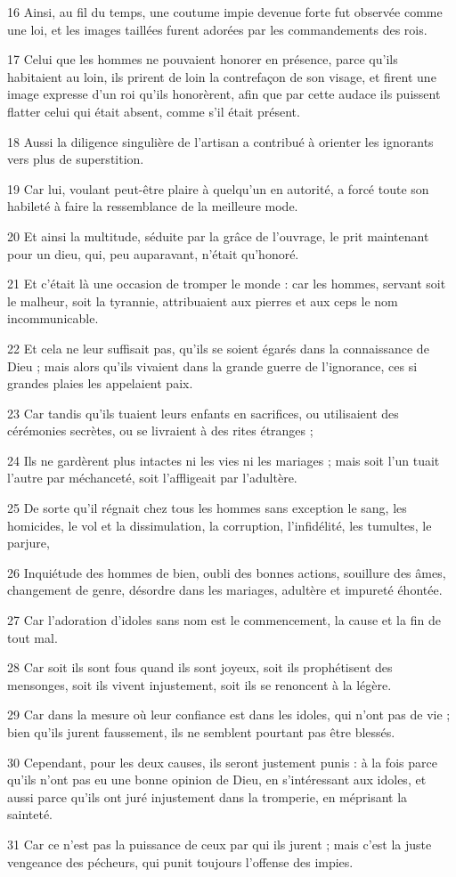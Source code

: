\par 16 Ainsi, au fil du temps, une coutume impie devenue forte fut observée comme une loi, et les images taillées furent adorées par les commandements des rois.
\par 17 Celui que les hommes ne pouvaient honorer en présence, parce qu'ils habitaient au loin, ils prirent de loin la contrefaçon de son visage, et firent une image expresse d'un roi qu'ils honorèrent, afin que par cette audace ils puissent flatter celui qui était absent, comme s'il était présent.
\par 18 Aussi la diligence singulière de l'artisan a contribué à orienter les ignorants vers plus de superstition.
\par 19 Car lui, voulant peut-être plaire à quelqu'un en autorité, a forcé toute son habileté à faire la ressemblance de la meilleure mode.
\par 20 Et ainsi la multitude, séduite par la grâce de l'ouvrage, le prit maintenant pour un dieu, qui, peu auparavant, n'était qu'honoré.
\par 21 Et c'était là une occasion de tromper le monde : car les hommes, servant soit le malheur, soit la tyrannie, attribuaient aux pierres et aux ceps le nom incommunicable.
\par 22 Et cela ne leur suffisait pas, qu'ils se soient égarés dans la connaissance de Dieu ; mais alors qu'ils vivaient dans la grande guerre de l'ignorance, ces si grandes plaies les appelaient paix.
\par 23 Car tandis qu'ils tuaient leurs enfants en sacrifices, ou utilisaient des cérémonies secrètes, ou se livraient à des rites étranges ;
\par 24 Ils ne gardèrent plus intactes ni les vies ni les mariages ; mais soit l'un tuait l'autre par méchanceté, soit l'affligeait par l'adultère.
\par 25 De sorte qu'il régnait chez tous les hommes sans exception le sang, les homicides, le vol et la dissimulation, la corruption, l'infidélité, les tumultes, le parjure,
\par 26 Inquiétude des hommes de bien, oubli des bonnes actions, souillure des âmes, changement de genre, désordre dans les mariages, adultère et impureté éhontée.
\par 27 Car l'adoration d'idoles sans nom est le commencement, la cause et la fin de tout mal.
\par 28 Car soit ils sont fous quand ils sont joyeux, soit ils prophétisent des mensonges, soit ils vivent injustement, soit ils se renoncent à la légère.
\par 29 Car dans la mesure où leur confiance est dans les idoles, qui n'ont pas de vie ; bien qu'ils jurent faussement, ils ne semblent pourtant pas être blessés.
\par 30 Cependant, pour les deux causes, ils seront justement punis : à la fois parce qu'ils n'ont pas eu une bonne opinion de Dieu, en s'intéressant aux idoles, et aussi parce qu'ils ont juré injustement dans la tromperie, en méprisant la sainteté.
\par 31 Car ce n'est pas la puissance de ceux par qui ils jurent ; mais c'est la juste vengeance des pécheurs, qui punit toujours l'offense des impies.

